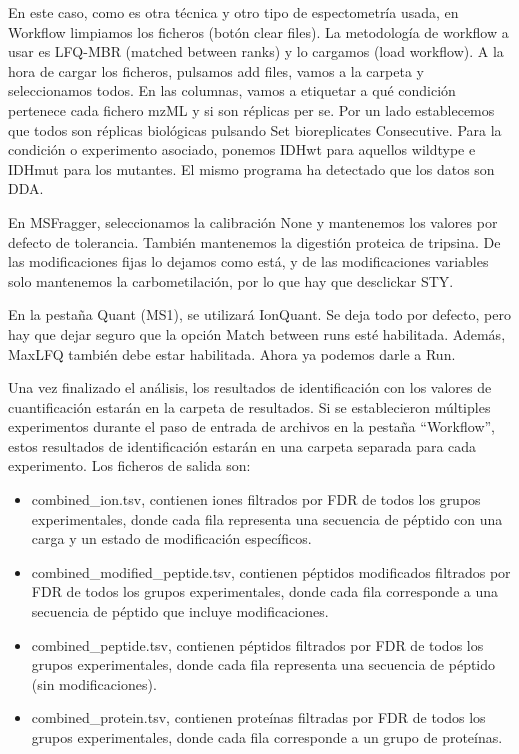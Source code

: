 \documentclass[nochap]{config/ejercicios}
\begin{document}
En este caso, como es otra técnica y otro tipo de espectometría usada, en Workflow limpiamos los ficheros (botón clear files). La metodología de workflow a usar es LFQ-MBR (matched between ranks) y lo cargamos (load workflow). A la hora de cargar los ficheros, pulsamos add files, vamos a la carpeta y seleccionamos todos. En las columnas, vamos a etiquetar a qué condición pertenece cada fichero mzML y si son réplicas per se. Por un lado establecemos que todos son réplicas biológicas pulsando Set bioreplicates Consecutive. Para la condición o experimento asociado, ponemos IDHwt para aquellos wildtype e IDHmut para los mutantes. El mismo programa ha detectado que los datos son DDA.

En MSFragger, seleccionamos la calibración None y mantenemos los valores por defecto de tolerancia. También mantenemos la digestión proteica de tripsina. De las modificaciones fijas lo dejamos como está, y de las modificaciones variables solo mantenemos la carbometilación, por lo que hay que desclickar STY. 

En la pestaña Quant (MS1), se utilizará IonQuant. Se deja todo por defecto, pero hay que dejar seguro que la opción Match between runs esté habilitada. Además, MaxLFQ también debe estar habilitada. Ahora ya podemos darle a Run.

Una vez finalizado el análisis, los resultados de identificación con los valores de cuantificación estarán en la carpeta de resultados. Si se establecieron múltiples experimentos durante el paso de entrada de archivos en la pestaña “Workflow”, estos resultados de identificación estarán en una carpeta separada para cada experimento. Los ficheros de salida son:
\begin{itemize}
\item combined\_ion.tsv, contienen iones filtrados por FDR de todos los grupos experimentales, donde cada fila representa una secuencia de péptido con una carga y un estado de modificación específicos.
\item combined\_modified\_peptide.tsv, contienen péptidos modificados filtrados por FDR de todos los grupos experimentales, donde cada fila corresponde a una secuencia de péptido que incluye modificaciones.
\item combined\_peptide.tsv, contienen péptidos filtrados por FDR de todos los grupos experimentales, donde cada fila representa una secuencia de péptido (sin modificaciones).
\item combined\_protein.tsv, contienen proteínas filtradas por FDR de todos los grupos experimentales, donde cada fila corresponde a un grupo de proteínas.
\end{itemize}
\end{document}
